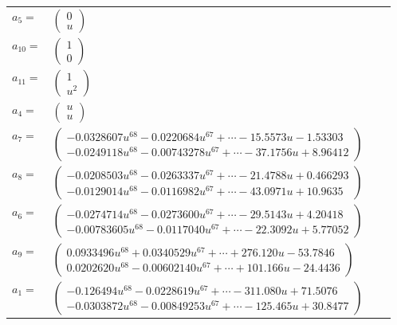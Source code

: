 \documentclass[1p]{elsarticle_modified}
\theoremstyle{definition}
\begin{document}
\begin{tabular}{m{7pt} m{180pt} m{7pt} m{180pt} }
\flushright $a_{5}=$&$\begin{pmatrix}0\\u\end{pmatrix}$ \\
\flushright $a_{10}=$&$\begin{pmatrix}1\\0\end{pmatrix}$ \\
\flushright $a_{11}=$&$\begin{pmatrix}1\\u^2\end{pmatrix}$ \\
\flushright $a_{4}=$&$\begin{pmatrix}u\\u\end{pmatrix}$ \\
\flushright $a_{7}=$&$\begin{pmatrix}-0.0328607 u^{68}-0.0220684 u^{67}+\cdots-15.5573 u-1.53303\\-0.0249118 u^{68}-0.00743278 u^{67}+\cdots-37.1756 u+8.96412\end{pmatrix}$ \\
\flushright $a_{8}=$&$\begin{pmatrix}-0.0208503 u^{68}-0.0263337 u^{67}+\cdots-21.4788 u+0.466293\\-0.0129014 u^{68}-0.0116982 u^{67}+\cdots-43.0971 u+10.9635\end{pmatrix}$ \\
\flushright $a_{6}=$&$\begin{pmatrix}-0.0274714 u^{68}-0.0273600 u^{67}+\cdots-29.5143 u+4.20418\\-0.00783605 u^{68}-0.0117040 u^{67}+\cdots-22.3092 u+5.77052\end{pmatrix}$ \\
\flushright $a_{9}=$&$\begin{pmatrix}0.0933496 u^{68}+0.0340529 u^{67}+\cdots+276.120 u-53.7846\\0.0202620 u^{68}-0.00602140 u^{67}+\cdots+101.166 u-24.4436\end{pmatrix}$ \\
\flushright $a_{1}=$&$\begin{pmatrix}-0.126494 u^{68}-0.0228619 u^{67}+\cdots-311.080 u+71.5076\\-0.0303872 u^{68}-0.00849253 u^{67}+\cdots-125.465 u+30.8477\end{pmatrix}$ \\

\end{tabular}
\end{document}
